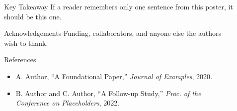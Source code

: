 \documentclass[final]{beamer}
\newlength{\sepwidth}
\newlength{\colwidth}
\newcommand{\separatorcolumn}{\begin{column}{\sepwidth}\end{column}}
\begin{document}
\begin{frame}[t]
\begin{columns}[t]
\separatorcolumn

\begin{column}{\colwidth}
	\begin{alertblock}{Key Takeaway}
		If a reader remembers only one sentence from this poster, it
		should be this one.
	\end{alertblock}
	\begin{block}{Acknowledgements}
		Funding, collaborators, and anyone else the authors wish to
		thank.
	\end{block}
	\begin{block}{References}
		\begin{itemize}
			\item[{[1]}] A. Author, ``A Foundational Paper,''
				\emph{Journal of Examples}, 2020.
			\item[{[2]}] B. Author and C. Author, ``A Follow-up
				Study,'' \emph{Proc. of the Conference on
				Placeholders}, 2022.
		\end{itemize}
	\end{block}
\end{column}

\separatorcolumn
\end{columns}
\end{frame}
\end{document}
